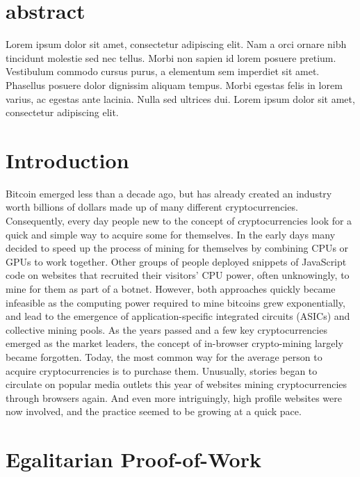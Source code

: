 
\section{abstract}
Lorem ipsum dolor sit amet, consectetur adipiscing elit. Nam a orci ornare nibh tincidunt molestie sed nec tellus. Morbi non sapien id lorem posuere pretium. Vestibulum commodo cursus purus, a elementum sem imperdiet sit amet. Phasellus posuere dolor dignissim aliquam tempus. Morbi egestas felis in lorem varius, ac egestas ante lacinia. Nulla sed ultrices dui. Lorem ipsum dolor sit amet, consectetur adipiscing elit. 



\section{Introduction}

Bitcoin emerged less than a decade ago, but has already created an industry worth billions of dollars made up of many different cryptocurrencies. Consequently, every day people new to the concept of cryptocurrencies look for a quick and simple way to acquire some for themselves. In the early days many decided to speed up the process of mining for themselves by combining CPUs or GPUs to work together. Other groups of people deployed snippets of JavaScript code on websites that recruited their visitors’ CPU power, often unknowingly, to mine for them as part of a botnet. However, both approaches quickly became infeasible as the computing power required to mine bitcoins grew exponentially, and lead to the emergence of application-specific integrated circuits (ASICs) and collective mining pools. As the years passed and a few key cryptocurrencies emerged as the market leaders, the concept of in-browser crypto-mining largely became forgotten. Today, the most common way for the average person to acquire cryptocurrencies is to purchase them. Unusually, stories began to circulate on popular media outlets this year of websites mining cryptocurrencies through browsers again. And even more intriguingly, high profile websites were now involved, and the practice seemed to be growing at a quick pace.



\section{Egalitarian Proof-of-Work}

